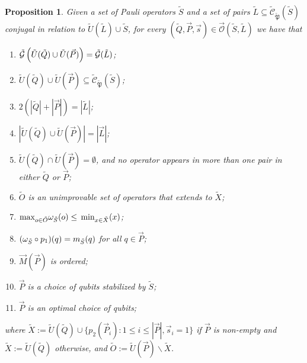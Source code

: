 \documentclass[twocolumn,showpacs,preprintnumbers,amsmath,amssymb,nofootinbib,pra,floatfix]{revtex4-1}
\newtheorem{proposition}{Proposition}
\newcommand{\lst}{\vec}
\newcommand{\set}{\tilde}
\newcommand{\genfun}{\tilde{\mathcal{G}}}
\newcommand{\pauligroup}{{\set{\mathfrak{P}}}}
\newcommand{\centralizer}{\set{\mathcal{C}}}
\newcommand{\unpack}{\set U}
\newcommand{\optimizer}{\lst{\mathcal{O}}}
\begin{document}
\begin{proposition}
\label{proposition:properties of the algorithm}
Given a set of Pauli operators $\set S$ and a set of pairs $\set L\subseteq\centralizer_\pauligroup(\set S)$ conjugal in relation to $\set U(\set L)\cup\set S$, for every $(\set Q,\lst P,\lst s)\in\optimizer(\set S,\set L)$ we have that
\begin{enumerate}
\item $\genfun\paren{\set U(\set Q)\cup\set U(\lst P)}=\genfun(\set L)$;
\item $\set U(\set Q)\cup\set U(\lst P)\subseteq\centralizer_\pauligroup(\set S)$;
\item $2(|\set Q|+|\lst P|)=|\set L|$;
\item $|\set U(\set Q)\cup\set U(\lst P)|=|\lst L|$;
\item $\set U(\set Q)\cap\set U(\lst P)=\emptyset$, and no operator appears in more than one pair in either $\set Q$ or $\lst P$;
\item $\set O$ is an unimprovable set of operators that extends to $\set X$;
\item $\max_{o\in\set O}\om_{\set S}(o)\le\min_{x\in\set X}(x)$;
\item $(\om_{\set S}\circ p_1)(q)=m_{\set S}(q)$ for all $q\in\lst P$;
\item $\lst M(\lst P)$ is ordered;
\item $\lst P$ is a choice of qubits stabilized by $\set S$;
\item $\lst P$ is an optimal choice of qubits;
\end{enumerate}
where $\set X := \unpack(\set Q)\cup\{p_2(\lst P_i):1 \le i \le |\lst P|, \lst s_i=1\}$ if $\lst P$ is non-empty and $\set X := \unpack(\set Q)$ otherwise, and $\set O:=\unpack(\lst P)\backslash\set X$.
\end{proposition}
\end{document}
